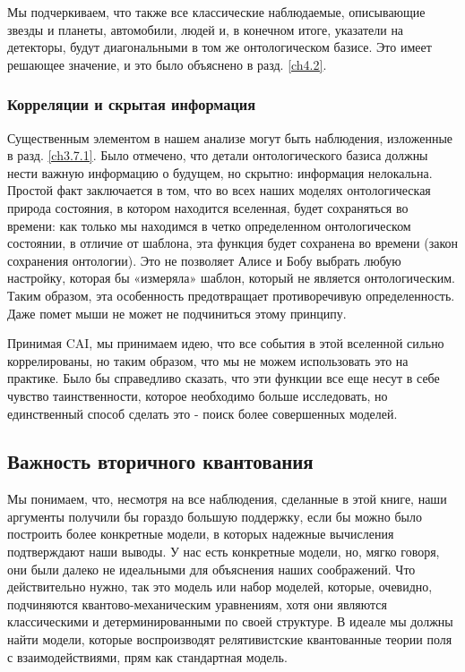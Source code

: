 \documentclass[main.tex]{subfiles}
\begin{document}
Мы подчеркиваем, что также все классические наблюдаемые, описывающие звезды и планеты, автомобили, людей и, в конечном итоге, указатели на детекторы, будут диагональными в том же онтологическом базисе. Это имеет решающее значение, и это было объяснено в разд. \ref{ch4.2}.

\subsubsection{Корреляции и скрытая информация}\label{ch10.3.3}

Существенным элементом в нашем анализе могут быть наблюдения, изложенные в разд. \ref{ch3.7.1}. Было отмечено, что детали онтологического базиса должны нести важную информацию о будущем, но скрытно: информация нелокальна. Простой факт заключается в том, что во всех наших моделях онтологическая природа состояния, в котором находится вселенная, будет сохраняться во времени: как только мы находимся в четко определенном онтологическом состоянии, в отличие от шаблона, эта функция будет сохранена во времени (закон сохранения онтологии). Это не позволяет Алисе и Бобу выбрать любую настройку, которая бы «измеряла» шаблон, который не является онтологическим. Таким образом, эта особенность предотвращает противоречивую определенность. Даже помет мыши не может не подчиниться этому принципу.

Принимая CAI, мы принимаем идею, что все события в этой вселенной сильно коррелированы, но таким образом, что мы не можем использовать это на практике. Было бы справедливо сказать, что эти функции все еще несут в себе чувство таинственности, которое необходимо больше исследовать, но единственный способ сделать это - поиск более совершенных моделей.

\subsection{Важность вторичного квантования}\label{ch10.4}

Мы понимаем, что, несмотря на все наблюдения, сделанные в этой книге, наши аргументы получили бы гораздо большую поддержку, если бы можно было построить более конкретные модели, в которых надежные вычисления подтверждают наши выводы. У нас есть конкретные модели, но, мягко говоря, они были далеко не идеальными для объяснения наших соображений. Что действительно нужно, так это модель или набор моделей, которые, очевидно, подчиняются квантово-механическим уравнениям, хотя они являются классическими и детерминированными по своей структуре. В идеале мы должны найти модели, которые воспроизводят релятивистские квантованные теории поля с взаимодействиями, прям как стандартная модель.
\end{document}
